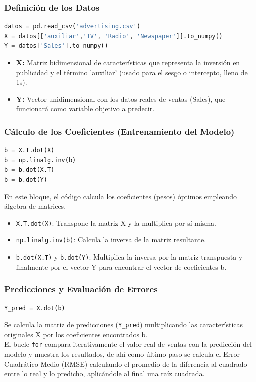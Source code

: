 \documentclass[]{article}
\begin{document}
\subsubsection*{Definición de los Datos}
\begin{lstlisting}[language=Python]
datos = pd.read_csv('advertising.csv')
X = datos[['auxiliar','TV', 'Radio', 'Newspaper']].to_numpy()
Y = datos['Sales'].to_numpy()
\end{lstlisting}
\begin{itemize}
    \item \textbf{X:} Matriz bidimensional de características que representa la inversión en publicidad y el término 'auxiliar' (usado para el sesgo o intercepto, lleno de 1s).
    \item \textbf{Y:} Vector unidimensional con los datos reales de ventas (Sales), que funcionará como variable objetivo a predecir.
\end{itemize}

\subsubsection*{Cálculo de los Coeficientes (Entrenamiento del Modelo)}
\begin{lstlisting}[language=Python]
b = X.T.dot(X)
b = np.linalg.inv(b)
b = b.dot(X.T)
b = b.dot(Y)
\end{lstlisting}
En este bloque, el código calcula los coeficientes (pesos) óptimos empleando álgebra de matrices.
\begin{itemize}
    \item \texttt{X.T.dot(X)}: Transpone la matriz X y la multiplica por sí misma.
    \item \texttt{np.linalg.inv(b)}: Calcula la inversa de la matriz resultante.
    \item \texttt{b.dot(X.T)} y \texttt{b.dot(Y)}: Multiplica la inversa por la matriz transpuesta y finalmente por el vector Y para encontrar el vector de coeficientes b.
\end{itemize}

\subsubsection*{Predicciones y Evaluación de Errores}
\begin{lstlisting}[language=Python]
Y_pred = X.dot(b)
\end{lstlisting}
Se calcula la matriz de predicciones (\texttt{Y\_pred}) multiplicando las características originales X por los coeficientes encontrados b.\\
El bucle \texttt{for} compara iterativamente el valor real de ventas con la predicción del modelo y muestra los resultados, de ahí como último paso se calcula el Error Cuadrático Medio (RMSE) calculando el promedio de la diferencia al cuadrado entre lo real y lo predicho, aplicándole al final una raíz cuadrada.
\end{document}
